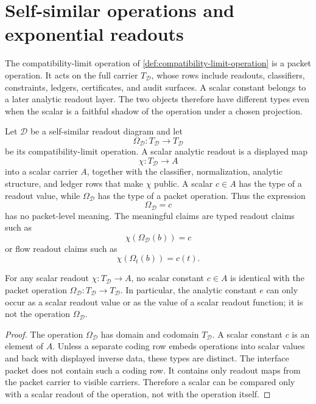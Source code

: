 \section{Self-similar operations and exponential readouts}
\label{sec:self-similar-exponential-readouts}

The compatibility-limit operation of
\autoref{def:compatibility-limit-operation} is a packet operation. It acts
on the full carrier $T_{\mathcal D}$, whose rows include readouts,
classifiers, constraints, ledgers, certificates, and audit surfaces. A
scalar constant belongs to a later analytic readout layer. The two objects
therefore have different types even when the scalar is a faithful shadow of
the operation under a chosen projection.

\begin{definition}
\label{def:operation-readout-type-boundary}
Let $\mathcal D$ be a self-similar readout diagram and let
$$
\Omega_{\mathcal D}:T_{\mathcal D}\to T_{\mathcal D}
$$
be its compatibility-limit operation. A scalar analytic readout is a
displayed map
$$
\chi:T_{\mathcal D}\to A
$$
into a scalar carrier $A$, together with the classifier, normalization,
analytic structure, and ledger rows that make $\chi$ public. A scalar
$c\in A$ has the type of a readout value, while $\Omega_{\mathcal D}$ has
the type of a packet operation. Thus the expression
$$
\Omega_{\mathcal D}=c
$$
has no packet-level meaning. The meaningful claims are typed readout
claims such as
$$
\chi(\Omega_{\mathcal D}(b))=c
$$
or flow readout claims such as
$$
\chi(\Omega_t(b))=c(t).
$$
\end{definition}

\begin{theorem}
\label{thm:constants-not-packet-operations}
For any scalar readout $\chi:T_{\mathcal D}\to A$, no scalar constant
$c\in A$ is identical with the packet operation
$\Omega_{\mathcal D}:T_{\mathcal D}\to T_{\mathcal D}$. In particular, the
analytic constant $e$ can only occur as a scalar readout value or as the
value of a scalar readout function; it is not the operation
$\Omega_{\mathcal D}$.
\end{theorem}

\begin{proof}
The operation $\Omega_{\mathcal D}$ has domain and codomain
$T_{\mathcal D}$. A scalar constant $c$ is an element of $A$. Unless a
separate coding row embeds operations into scalar values and back with
displayed inverse data, these types are distinct. The interface packet
does not contain such a coding row. It contains only readout maps from the
packet carrier to visible carriers. Therefore a scalar can be compared
only with a scalar readout of the operation, not with the operation itself.
\end{proof}

